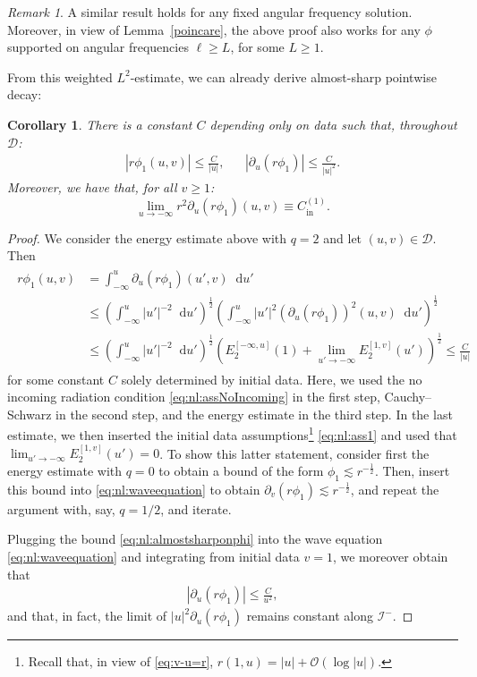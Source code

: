 \documentclass[11pt,english]{article}
\numberwithin{equation}{section}
\newtheorem{cor}{Corollary}[section]
\theoremstyle{remark}
\newtheorem{rem}{Remark}[section]
\theoremstyle{plain}
\theoremstyle{remark}
\newcommand{\dd}{\mathop{}\!\mathrm{d}}
\newcommand{\pu}{\partial_u}
\newcommand{\pv}{\partial_v}
\renewcommand{\(}{\left(}
\renewcommand{\)}{\right)}
\newcommand{\cc}{C_{\mathrm{in}}^{(1)}}
\newcommand{\pho}{(r\phi_1)}
\begin{document}
\begin{rem}
A similar result holds for any fixed angular frequency solution. Moreover, in view of Lemma~\ref{poincare}, the above proof also works for any $\phi$ supported on angular frequencies $\ell\geq L$, for some $L\geq 1$.
\end{rem}
From this weighted $L^2$-estimate, we can already derive almost-sharp pointwise decay:
\begin{cor}\label{cor:almostsharp}
There is a constant $C$ depending only on data such that, throughout $\mathcal{D}$:
\begin{align}\label{eq:nl:almost.sharp}
|r\phi_1(u,v)|\leq \frac{C}{|u|},&& |\pu(r\phi_1)|\leq\frac{C}{|u|^2}.
\end{align}
Moreover, we have that, for all $v\geq 1$:
\begin{equation}
\lim_{u\to-\infty}r^2\pu(r\phi_1)(u,v)\equiv\cc.
\end{equation}
\end{cor}
\begin{proof}
We consider the energy estimate above with  $q=2$ and let $(u,v)\in\mathcal D$. Then
\begin{align}\label{eq:nl:almostsharponphi}
\begin{split}
r\phi_1(u,v)&=\int_{-\infty}^u\pu\pho(u',v)\dd u'\\
&\leq \left(\int_{-\infty}^u |u'|^{-2}\dd u'\right)^\frac12  \left(\int_{-\infty}^u |u'|^{2}(\pu\pho)^2(u,v)\dd u'\right)^\frac12 \\
&\leq \left(\int_{-\infty}^u |u'|^{-2}\dd u'\right)^\frac12  \left(E_2^{[-\infty,u]}(1)+\lim_{u'\to-\infty}E_2^{[1,v]}(u')\right)^\frac12\leq \frac{C}{|u|}
\end{split}
\end{align}
for some constant $C$ solely determined by initial data. 
Here, we used the no incoming radiation condition \eqref{eq:nl:assNoIncoming} in the first step, Cauchy--Schwarz in the second step, and the energy estimate in the third step. 
In the last estimate, we then inserted the initial data assumptions\footnote{Recall that, in view of \eqref{eq:v-u=r}, $r(1,u)=|u|+\mathcal{O}(\log |u|)$.} \eqref{eq:nl:ass1} and used that $\lim_{u'\to-\infty}E_2^{[1,v]}(u')=0$. To show this latter statement, consider first the energy estimate with $q=0$ to obtain a bound of the form $\phi_1\lesssim r^{-\frac12}$. Then, insert this bound into \eqref{eq:nl:waveequation}  to obtain $\pv(r\phi_1)\lesssim r^{-\frac12}$, and repeat the argument with, say, $q=1/2$, and iterate.

Plugging the bound \eqref{eq:nl:almostsharponphi} into the wave equation \eqref{eq:nl:waveequation} and integrating from initial data $v=1$, we moreover obtain that
\begin{align*}
|\pu(r\phi_1)|\leq \frac{C}{u^2},
\end{align*}
and that, in fact, the limit of $|u|^2\pu\pho$ remains constant along $\mathcal{I}^-$. 
\end{proof}
\end{document}
